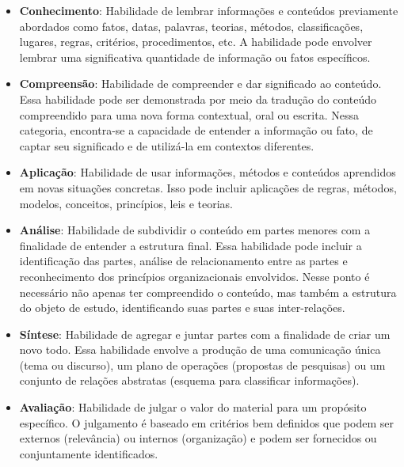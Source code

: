 \begin{itemize}[label={},leftmargin=2em]
\item \textbf{Conhecimento}: Habilidade de lembrar informações e conteúdos previamente abordados como fatos, datas, palavras, teorias, métodos, classificações, lugares, regras, critérios, procedimentos, etc. A habilidade pode envolver lembrar uma significativa quantidade de informação ou fatos específicos.
\end{itemize}
\vspace{-0.4cm}
\begin{itemize}[label={},leftmargin=2em]
\item \textbf{Compreensão}: Habilidade de compreender e dar significado ao conteúdo. Essa habilidade pode ser demonstrada por meio da tradução do conteúdo compreendido para uma nova forma contextual, oral ou escrita. Nessa categoria, encontra-se a capacidade de entender a informação ou fato, de captar seu significado e de utilizá-la em contextos diferentes.
\end{itemize}
\vspace{-0.4cm}
\begin{itemize}[label={},leftmargin=2em]
\item \textbf{Aplicação}: Habilidade de usar informações, métodos e conteúdos aprendidos em novas situações concretas. Isso pode incluir aplicações de regras, métodos, modelos, conceitos, princípios, leis e teorias. 
\end{itemize}
\vspace{-0.4cm}
\begin{itemize}[label={},leftmargin=2em]
\item \textbf{Análise}: Habilidade de subdividir o conteúdo em partes menores com a finalidade de entender a estrutura final. Essa habilidade pode incluir a identificação das partes, análise de relacionamento entre as partes e reconhecimento dos princípios organizacionais envolvidos. Nesse ponto é necessário não apenas ter compreendido o conteúdo, mas também a estrutura do objeto de estudo, identificando suas partes e suas inter-relações.
\end{itemize}
\vspace{-0.4cm}
\begin{itemize}[label={},leftmargin=2em]
\item \textbf{Síntese}: Habilidade de agregar e juntar partes com a finalidade de criar um novo todo. Essa habilidade envolve a produção de uma comunicação única (tema ou discurso), um plano de operações (propostas de pesquisas) ou um conjunto de relações abstratas (esquema para classificar informações). 
\end{itemize}
\vspace{-0.4cm}
\begin{itemize}[label={},leftmargin=2em]
\item \textbf{Avaliação}: Habilidade de julgar o valor do material para um propósito específico. O julgamento é baseado em critérios bem definidos que podem ser externos (relevância) ou internos (organização) e podem ser fornecidos ou conjuntamente identificados.
\end{itemize}


